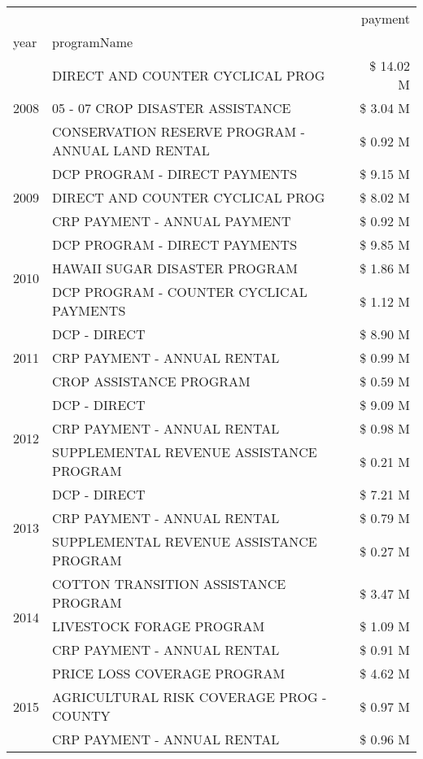 \begin{tabular}{llr}
\toprule
 &  & payment \\
year & programName &  \\
\midrule
\multirow[t]{3}{*}{2008} & DIRECT AND COUNTER CYCLICAL PROG & \$ 14.02 M \\
 & 05 - 07 CROP DISASTER ASSISTANCE & \$ 3.04 M \\
 & CONSERVATION RESERVE PROGRAM - ANNUAL LAND RENTAL & \$ 0.92 M \\
\cline{1-3}
\multirow[t]{3}{*}{2009} & DCP PROGRAM - DIRECT PAYMENTS & \$ 9.15 M \\
 & DIRECT AND COUNTER CYCLICAL PROG & \$ 8.02 M \\
 & CRP PAYMENT - ANNUAL PAYMENT & \$ 0.92 M \\
\cline{1-3}
\multirow[t]{3}{*}{2010} & DCP PROGRAM - DIRECT PAYMENTS & \$ 9.85 M \\
 & HAWAII SUGAR DISASTER PROGRAM & \$ 1.86 M \\
 & DCP PROGRAM - COUNTER CYCLICAL PAYMENTS & \$ 1.12 M \\
\cline{1-3}
\multirow[t]{3}{*}{2011} & DCP - DIRECT & \$ 8.90 M \\
 & CRP PAYMENT - ANNUAL RENTAL & \$ 0.99 M \\
 & CROP ASSISTANCE PROGRAM & \$ 0.59 M \\
\cline{1-3}
\multirow[t]{3}{*}{2012} & DCP - DIRECT & \$ 9.09 M \\
 & CRP PAYMENT - ANNUAL RENTAL & \$ 0.98 M \\
 & SUPPLEMENTAL REVENUE ASSISTANCE PROGRAM & \$ 0.21 M \\
\cline{1-3}
\multirow[t]{3}{*}{2013} & DCP - DIRECT & \$ 7.21 M \\
 & CRP PAYMENT - ANNUAL RENTAL & \$ 0.79 M \\
 & SUPPLEMENTAL REVENUE ASSISTANCE PROGRAM & \$ 0.27 M \\
\cline{1-3}
\multirow[t]{3}{*}{2014} & COTTON TRANSITION ASSISTANCE PROGRAM & \$ 3.47 M \\
 & LIVESTOCK FORAGE PROGRAM & \$ 1.09 M \\
 & CRP PAYMENT - ANNUAL RENTAL & \$ 0.91 M \\
\cline{1-3}
\multirow[t]{3}{*}{2015} & PRICE LOSS COVERAGE PROGRAM & \$ 4.62 M \\
 & AGRICULTURAL RISK COVERAGE PROG - COUNTY & \$ 0.97 M \\
 & CRP PAYMENT - ANNUAL RENTAL & \$ 0.96 M \\
\cline{1-3}

\end{tabular}

